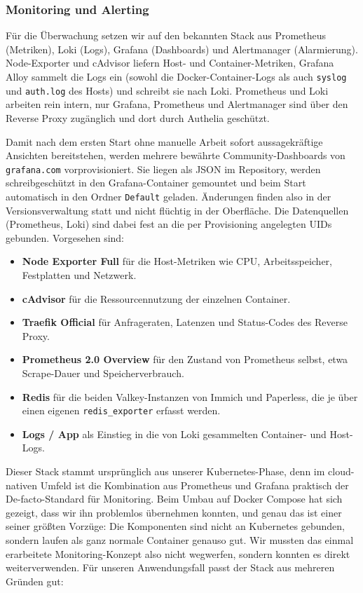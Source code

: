 \subsubsection{Monitoring und Alerting} \label{sec:apphost-monitoring}

Für die Überwachung setzen wir auf den bekannten Stack aus Prometheus
(Metriken), Loki (Logs), Grafana (Dashboards) und Alertmanager (Alarmierung).
Node-Exporter und cAdvisor liefern Host- und Container-Metriken, Grafana
Alloy sammelt die Logs ein (sowohl die Docker-Container-Logs als auch
\texttt{syslog} und \texttt{auth.log} des Hosts) und schreibt sie nach Loki.
Prometheus und Loki arbeiten rein intern, nur Grafana,
Prometheus und Alertmanager sind über den Reverse Proxy zugänglich und dort
durch Authelia geschützt.

Damit nach dem ersten Start ohne manuelle Arbeit sofort aussagekräftige
Ansichten bereitstehen, werden mehrere bewährte Community-Dashboards von
\texttt{grafana.com} vorprovisioniert. Sie liegen als \ac{JSON}
im Repository, werden schreibgeschützt in den Grafana-Container gemountet und
beim Start automatisch in den Ordner \texttt{Default} geladen. Änderungen
finden also in der Versionsverwaltung statt und nicht flüchtig in der
Oberfläche. Die Datenquellen (Prometheus, Loki) sind dabei fest an die per
Provisioning angelegten \ac{UID}s gebunden. Vorgesehen sind:

\begin{itemize}
  \item \textbf{Node Exporter Full} für die Host-Metriken wie
    \ac{CPU}, Arbeitsspeicher, Festplatten und Netzwerk.
  \item \textbf{cAdvisor} für die Ressourcennutzung der einzelnen
    Container.
  \item \textbf{Traefik Official} für Anfrageraten, Latenzen und
    Status-Codes des Reverse Proxy.
  \item \textbf{Prometheus 2.0 Overview} für den Zustand von
    Prometheus selbst, etwa Scrape-Dauer und Speicherverbrauch.
  \item \textbf{Redis} für die beiden Valkey-Instanzen von Immich und
    Paperless, die je über einen eigenen \texttt{redis\_exporter} erfasst
    werden.
  \item \textbf{Logs / App} als Einstieg in die von Loki
    gesammelten Container- und Host-Logs.
\end{itemize}


Dieser Stack stammt ursprünglich aus unserer Kubernetes-Phase, denn im
cloud-nativen Umfeld ist die Kombination aus Prometheus und Grafana praktisch
der De-facto-Standard für Monitoring. Beim Umbau auf Docker Compose hat sich
gezeigt, dass wir ihn problemlos übernehmen konnten, und genau das ist einer
seiner größten Vorzüge: Die Komponenten sind nicht an Kubernetes gebunden,
sondern laufen als ganz normale Container genauso gut. Wir mussten das einmal
erarbeitete Monitoring-Konzept also nicht wegwerfen, sondern konnten es direkt
weiterverwenden. Für unseren Anwendungsfall passt der Stack aus mehreren
Gründen gut:


